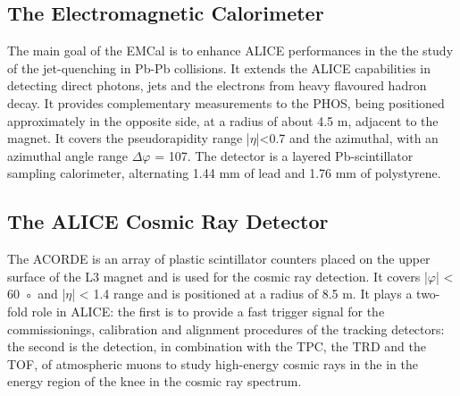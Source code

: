 \subsection*{The Electromagnetic Calorimeter}
The main goal of the EMCal is to enhance ALICE performances in the the study of the jet-quenching in Pb-Pb collisions. It extends the ALICE capabilities in detecting direct photons, jets and the electrons from heavy flavoured hadron decay. It provides complementary measurements to the PHOS, being positioned approximately in the opposite side, at a radius of about 4.5 m, adjacent to the magnet. It covers the pseudorapidity range |$\eta$|<0.7 and the azimuthal, with an azimuthal angle range $\Delta\varphi$ = 107\textdegree. The detector is a layered Pb-scintillator sampling calorimeter, alternating 1.44 mm of lead and 1.76 mm of polystyrene.
\subsection*{The ALICE Cosmic Ray Detector}
The ACORDE is an array of plastic scintillator counters placed on the upper surface of the L3 magnet and is used for the cosmic ray detection. It covers |$\varphi$| < 60 ◦ and |$\eta$| < 1.4 range and is positioned at a radius of 8.5 m. It plays a two-fold role in ALICE: the first is to provide a fast trigger signal for the commissionings, calibration and alignment procedures of the tracking detectors: the second is the detection, in combination with the TPC, the TRD and the TOF, of atmospheric muons to study high-energy cosmic rays in the in the energy region of the knee in the cosmic ray spectrum.
